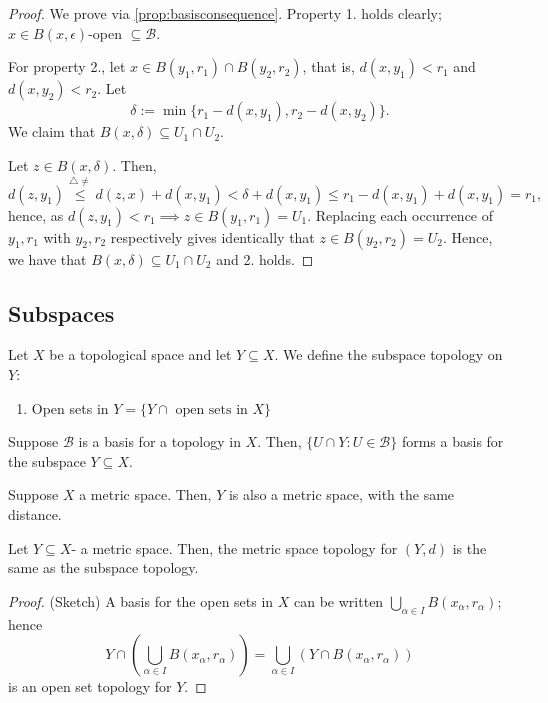 \begin{proof}
    We prove via \cref{prop:basisconsequence}. Property 1. holds clearly; $x\in B(x, \epsilon)$-open $\subseteq \mathcal{B}$.

    For property 2., let $x \in B(y_1, r_1) \cap B(y_2, r_2)$, that is, $d(x, y_1) < r_1$ and $d(x, y_2) < r_2$. Let $$\delta := \min \{r_1 - d(x, y_1), r_2 - d(x, y_2)\}.$$ We claim that $B(x, \delta) \subseteq U_1 \cap U_2$.

    Let $z \in B(x, \delta)$. Then, \[
    d(z, y_1) \overset{\triangle \neq}{\leq} d(z, x) + d(x, y_1) < \delta + d(x, y_1) \leq r_1 - d(x, y_1) + d(x, y_1) = r_1,   
    \]
    hence, as $d(z, y_1) < r_1 \implies z \in B(y_1, r_1) = U_1$. Replacing each occurrence of $y_1, r_1$ with $y_2, r_2$ respectively gives identically that $z \in B(y_2, r_2) = U_2$. Hence, we have that $B(x, \delta) \subseteq U_1 \cap U_2$ and 2. holds.
\end{proof}

\subsection{Subspaces}

\begin{definition}
    Let $X$ be a topological space and let $Y \subseteq X$. We define the subspace topology on $Y$:
    \begin{enumerate}
        \item Open sets in $Y = \{Y \cap \text{ open sets in } X\}$
    \end{enumerate}
\end{definition}

\begin{proposition}
    Suppose $\mathcal{B}$ is a basis for a topology in $X$. Then, $\{U \cap Y : U \in \mathcal{B}\}$ forms a basis for the subspace $Y \subseteq X$.

    Suppose $X$ a metric space. Then, $Y$ is also a metric space, with the same distance.
\end{proposition}

\begin{proposition}
    Let $Y \subseteq X$- a metric space. Then, the metric space topology for $(Y, d)$ is the same as the subspace topology.
\end{proposition}

\begin{proof}(Sketch) 
    A basis for the open sets in $X$ can be written $\bigcup_{\alpha \in I} B(x_\alpha, r_\alpha)$; hence $$Y \cap (\bigcup_{\alpha \in I} B(x_\alpha, r_\alpha)) =  \bigcup_{\alpha\in I} (Y \cap B(x_\alpha, r_\alpha))$$ is an open set topology for $Y$.
\end{proof}

